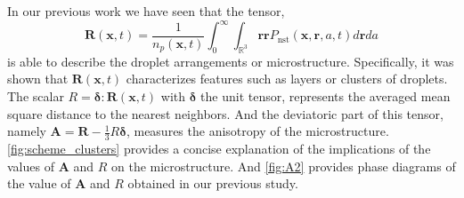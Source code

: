 In our previous work \citep{fintzi2024buoyancy} we have seen that the tensor,
\begin{equation}
    \textbf{R}(\textbf{x},t)
    = \frac{1}{n_p(\textbf{x},t)}
    \int_0^\infty 
    \int_{\mathbb{R}^3}
    \textbf{rr}
    P_\text{nst}(\textbf{x},\textbf{r},a,t)
    d\textbf{r}
    da
    \label{eq:RR}
\end{equation}
is able to describe the droplet arrangements or microstructure.
Specifically, it was shown that $\textbf{R}(\textbf{x},t)$ characterizes features such as layers or clusters of droplets. 
The scalar $R = \bm\delta:\textbf{R}(\textbf{x},t)$ with $\bm\delta$ the unit tensor, represents the averaged mean square distance to the nearest neighbors.
And the deviatoric part of this tensor, namely $\textbf{A} = \textbf{R}-\frac{1}{3}R\bm\delta$, measures the anisotropy of the microstructure. 
\ref{fig:scheme_clusters} provides a concise explanation of the implications of the values of $\textbf{A}$ and $R$ on the microstructure.  
And \ref{fig:A2} provides phase diagrams of the value of $\textbf{A}$ and $R$ obtained in our previous study. 
